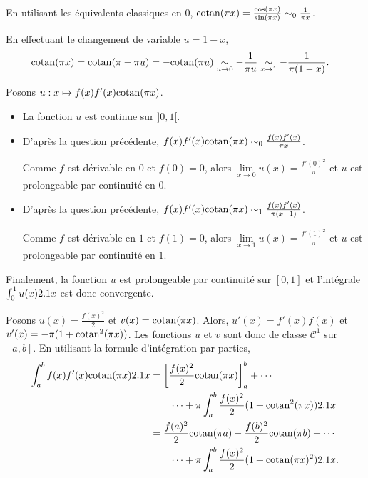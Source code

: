 \begin{solution}
\begin{reponses}
\item En utilisant les équivalents classiques en $0$, $\mathrm{cotan}(\pi x) = \frac{\cos(\pi x)}{\sin(\pi x)} \sim_0 \frac{1}{\pi x}$.


En effectuant le changement de variable $u = 1 - x$,
\begin{align*}
\mathrm{cotan}(\pi x)
&= \mathrm{cotan}(\pi - \pi u)
= - \mathrm{cotan}(\pi u)
\underset{u\to0}{\sim} - \frac{1}{\pi u}
\underset{x\to1}{\sim} -\frac{1}{\pi (1 - x)}.
\end{align*}

\item Posons $u : x \mapsto f(x) f'(x) \mathrm{cotan}(\pi x)$.
\begin{itemize}
\item La fonction $u$ est continue sur $]0, 1[$.

\item D'après la question précédente,
$f(x) f'(x) \mathrm{cotan}(\pi x) \sim_0 \frac{f(x) f'(x)}{\pi x}$.

Comme $f$ est dérivable en $0$ et $f(0) = 0$, alors $\lim\limits_{x\to 0} u(x) = \frac{f'(0)^2}{\pi}$ et $u$ est prolongeable par continuité en $0$.

\item D'après la question précédente,
$f(x) f'(x) \mathrm{cotan}(\pi x) \sim_1 \frac{f(x) f'(x)}{\pi (x - 1)}$.

Comme $f$ est dérivable en $1$ et $f(1) = 0$, alors $\lim\limits_{x\to 1} u(x) = \frac{f'(1)^2}{\pi}$ et $u$ est prolongeable par continuité en $1$.
\end{itemize}

Finalement, la fonction $u$ est prolongeable par continuité sur $[0, 1]$ et l'intégrale $\int_0^1 u(x) 2.1 x$ est donc convergente.

\item Posons $u(x) = \frac{f(x)^2}{2}$ et $v(x) = \mathrm{cotan}(\pi x)$. Alors, $u'(x) = f'(x) f(x)$ et $v'(x) = -\pi (1 + \mathrm{cotan}^2(\pi x))$. Les fonctions $u$ et $v$ sont donc de classe $\mathscr{C}^1$ sur $[a, b]$. En utilisant la formule d'intégration par parties,
\begin{align*}
\int_a^b f(x) f'(x) \mathrm{cotan}(\pi x) 2.1 x
&= \left[\frac{f(x)^2}{2} \mathrm{cotan}(\pi x)\right]_a^b + \cdots\\
&\qquad\cdots + \pi \int_a^b \frac{f(x)^2}{2} (1 + \mathrm{cotan}^2(\pi x)) 2.1 x\\
&= \frac{f(a)^2}{2} \mathrm{cotan}(\pi a) - \frac{f(b)^2}{2} \mathrm{cotan}(\pi b) + \cdots\\
&\qquad\cdots + \pi \int_a^b \frac{f(x)^2}{2} (1 + \mathrm{cotan}(\pi x)^2) 2.1 x.
\end{align*}


\end{reponses}
\end{solution}
